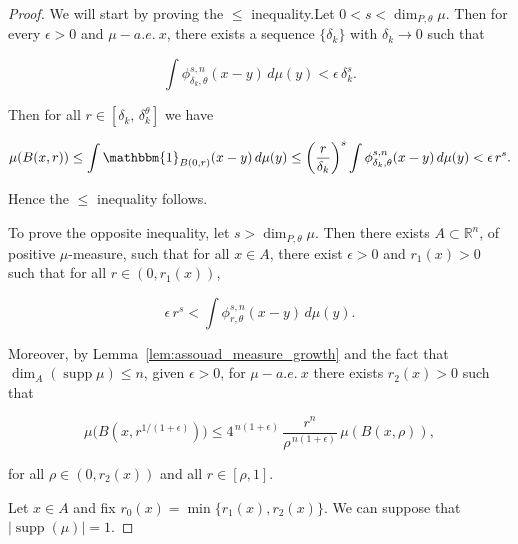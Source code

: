 \documentclass[12pt]{amsart}
\theoremstyle{definition}
\theoremstyle{remark}
\numberwithin{equation}{section}
\begin{document}
\begin{proof}We will start by proving the $\leq$ inequality.Let $0<s< \dim_{P,\theta} \mu$. Then for every $\epsilon>0$ and $\mu-a.e.\ x$, there exists a sequence $\{\delta_k\}$ with $\delta_k\to 0$ such that

$$\int \phi_{\delta_k,\theta}^{s,n}(x-y)\, d\mu(y) <\epsilon\, \delta_k^{s}.$$

Then for all $r\in [\delta_k,\, \delta_k^\theta]$ we have

$$\mu(B(x,r))\leq \int\mathbbm{1}_{B(0,r)}(x-y)\, d\mu(y)\leq \left(\frac{r}{\delta_k}\right)^s \int \phi_{\delta_k,\theta}^{s,n}(x-y)\, d\mu(y)<\epsilon\, r^s.$$

Hence the $\leq$ inequality follows.

To prove the opposite inequality, let $s>\dim_{P,\theta} \mu$. Then there exists $A\subset \mathbb{R}^n$, of positive $\mu$-measure, such that for all $x\in A$, there exist $\epsilon>0$ and $r_1(x)>0$ such that for all $r\in(0,r_1(x))$,

\begin{equation}\label{equation1}
\epsilon\, r^s < \int \phi_{r,\theta}^{s,n}(x-y)\, d\mu(y).\end{equation}

Moreover, by Lemma~\ref{lem:assouad_measure_growth} and the fact that $\dim_A(\operatorname{supp}\mu)\leq n$, given $\epsilon>0$, for $\mu-a.e.\ x$ there exists $r_2(x)>0$ such that

\begin{equation}\label{equation2}
\mu\bigl(B(x,r^{1/(1+\epsilon)})\bigr)\leq 4^{\,n(1+\epsilon)}\,\frac{r^{n}}{\rho^{\,n(1+\epsilon)}}\, \mu(B(x,\rho)),\end{equation}

for all $\rho\in(0,r_2(x))$ and all $r\in[\rho,1]$. 

Let $x\in A$ and fix $r_0(x)=\min\{r_1(x),r_2(x)\}$. We can suppose that$|\operatorname{supp}(\mu)|=1$.


\end{proof}
\end{document}
